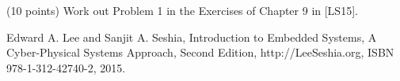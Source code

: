 \documentclass[a4paper, 12pt]{article}
\begin{document}
\newpage
\begin{problem}{}
(10 points) 
Work out Problem 1 in the Exercises of Chapter 9 in [LS15].

\noindent
[LS15] Edward A. Lee and Sanjit A. Seshia, Introduction to Embedded Systems, A Cyber-Physical Systems Approach, Second Edition, http://LeeSeshia.org, ISBN 978-1-312-42740-2, 2015. \\
\\
\begin{minipage}{1\textwidth}
		\rectangle{\linewidth}{22cm}
\end{minipage}
\newpage
\ \\
\begin{minipage}{1\textwidth}
		\rectangle{\linewidth}{24cm}
\end{minipage}
\newpage
\ \\
\begin{minipage}{1\textwidth}
		\rectangle{\linewidth}{24cm}
\end{minipage}
\newpage
\ \\
\begin{minipage}{1\textwidth}
		\rectangle{\linewidth}{24cm}
\end{minipage}
\end{problem}
\end{document}
